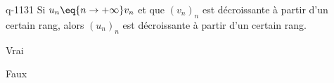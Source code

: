 \begin{truefalse}{q-1131}
Si $u_n \eq{n\to+\infty}  v_n$ et que $(v_n)_n$ est décroissante à partir d'un certain rang, alors $(u_n)_n$ est décroissante à partir d'un certain rang.
\item Vrai
\item* Faux
\end{truefalse}

